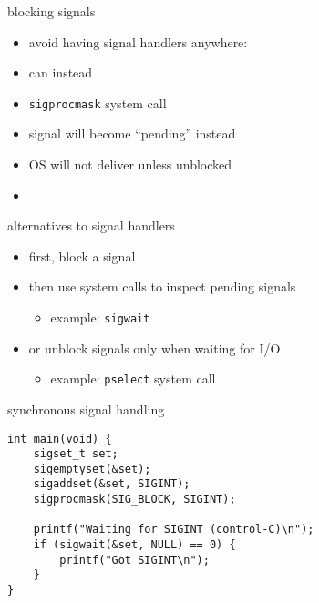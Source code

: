 \begin{frame}{blocking signals}
\begin{itemize}
\item avoid having signal handlers anywhere:
\item can instead 
\vspace{.5cm}
\item {\tt sigprocmask} system call
\item signal will become ``pending'' instead
\item OS will not deliver unless unblocked
\item {}
\end{itemize}
\end{frame}

\begin{frame}{alternatives to signal handlers}
\begin{itemize}
\item first, block a signal
\item then use system calls to inspect pending signals
    \begin{itemize}
    \item example: {\tt sigwait}
    \end{itemize}
\item or unblock signals only when waiting for I/O
    \begin{itemize}
    \item example: {\tt pselect} system call
    \end{itemize}
\end{itemize}
\end{frame}

\begin{frame}[fragile,label=syncSig]{synchronous signal handling}
\lstset{language=C,style=small}
\begin{lstlisting}
int main(void) {
    sigset_t set;
    sigemptyset(&set);
    sigaddset(&set, SIGINT);
    sigprocmask(SIG_BLOCK, SIGINT);
    
    printf("Waiting for SIGINT (control-C)\n"); 
    if (sigwait(&set, NULL) == 0) {
        printf("Got SIGINT\n");
    }
}
\end{lstlisting}
\end{frame}

